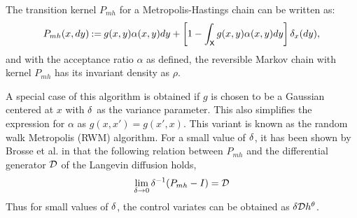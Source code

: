 The transition kernel $P_{mh}$ for a Metropolis-Hastings chain can be written as:
\begin{equation}
P_{mh}(x,dy) \eqdef g(x,y) \alpha(x,y) dy + \left [ 1 - \int_{\state} g(x,y) \alpha(x,y) dy \right] \delta_x (dy),
\label{e:kernel_mh}
\end{equation}
and with the acceptance ratio $\alpha$ as defined, the reversible Markov chain with kernel $P_{mh}$ has its invariant density as $\rho$.

A special case of this algorithm is obtained if $g$ is chosen to be a Gaussian centered at $x$ with $\delta$ as the variance parameter. This also simplifies the expression for $\alpha$ as $g(x,x') = g(x',x)$. This variant is known as the random walk Metropolis (RWM) algorithm. For a small value of $\delta$, it has been shown by Brosse et al. in \cite{brodurmeymourad18} that the following relation between $P_{mh}$ and the differential generator ${\cal D}$ of the Langevin diffusion holds, 
\[
\lim_{\delta \to 0} \delta^{-1} (P_{mh} - I) = {\cal D}
\]
Thus for small values of $\delta$, the control variates can be obtained as $\delta {\cal D} h^\theta$.  

